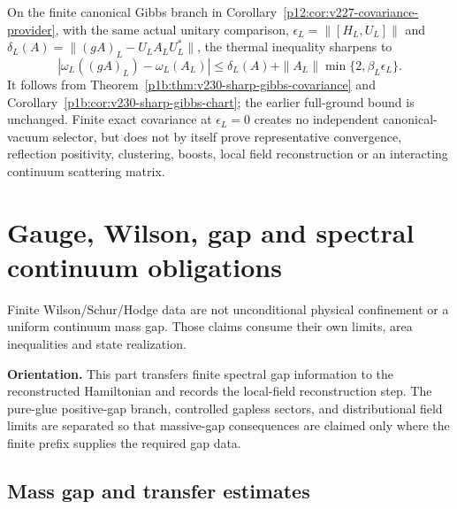 \documentclass[12pt,a4paper]{article}
\begin{document}


\begin{corollary}
\label{p12:cor:v230-sharp-gibbs-provider}
On the finite canonical Gibbs branch in
Corollary~\ref{p12:cor:v227-covariance-provider}, with the same actual
unitary comparison, $\epsilon_L=\|[H_L,U_L]\|$ and
$\delta_L(A)=\|(gA)_L-U_LA_LU_L^*\|$, the thermal inequality sharpens to
\[
 \boxed{
 |\omega_L((gA)_L)-\omega_L(A_L)|
 \le\delta_L(A)+\|A_L\|\min\{2,\beta_L\epsilon_L\}.}
\]
It follows from Theorem~\ref{p1b:thm:v230-sharp-gibbs-covariance}
and Corollary~\ref{p1b:cor:v230-sharp-gibbs-chart}; the earlier
full-ground bound is unchanged.  Finite exact covariance at
$\epsilon_L=0$ creates no independent canonical-vacuum selector,
but does not by itself prove representative convergence,
reflection positivity, clustering, boosts, local field reconstruction
or an interacting continuum scattering matrix.
\end{corollary}



\section{Gauge, Wilson, gap and spectral continuum obligations}
\label{p12:sec:v237-c4}
Finite Wilson/Schur/Hodge data are not unconditional physical confinement or a uniform continuum mass gap. Those claims consume their own limits, area inequalities and state realization.


\noindent\textbf{Orientation.}
This part transfers finite spectral gap information to the reconstructed Hamiltonian and records the local-field reconstruction step.  The pure-glue positive-gap branch, controlled gapless sectors, and distributional field limits are separated so that massive-gap consequences are claimed only where the finite prefix supplies the required gap data.


\subsection{Mass gap and transfer estimates}
\label{p12:sec:mass-gap-transfer}
\end{document}

